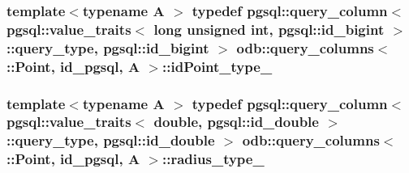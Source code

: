 \subsubsection[{id\+Point\+\_\+type\+\_\+}]{\setlength{\rightskip}{0pt plus 5cm}template$<$typename A $>$ typedef pgsql\+::query\+\_\+column$<$ pgsql\+::value\+\_\+traits$<$ long unsigned int, pgsql\+::id\+\_\+bigint $>$\+::query\+\_\+type, pgsql\+::id\+\_\+bigint $>$ odb\+::query\+\_\+columns$<$ \+::{\bf Point}, id\+\_\+pgsql, A $>$\+::{\bf id\+Point\+\_\+type\+\_\+}}\label{structodb_1_1query__columns_3_01_1_1_point_00_01id__pgsql_00_01_a_01_4_a1b73c11154d6a12b3bda33b0362e1cbd}
\hypertarget{structodb_1_1query__columns_3_01_1_1_point_00_01id__pgsql_00_01_a_01_4_a920c99ed9235ee77ecae8f3de56c88b5}{}
\subsubsection[{radius\+\_\+type\+\_\+}]{\setlength{\rightskip}{0pt plus 5cm}template$<$typename A $>$ typedef pgsql\+::query\+\_\+column$<$ pgsql\+::value\+\_\+traits$<$ double, pgsql\+::id\+\_\+double $>$\+::query\+\_\+type, pgsql\+::id\+\_\+double $>$ odb\+::query\+\_\+columns$<$ \+::{\bf Point}, id\+\_\+pgsql, A $>$\+::{\bf radius\+\_\+type\+\_\+}}\label{structodb_1_1query__columns_3_01_1_1_point_00_01id__pgsql_00_01_a_01_4_a920c99ed9235ee77ecae8f3de56c88b5}
\hypertarget{structodb_1_1query__columns_3_01_1_1_point_00_01id__pgsql_00_01_a_01_4_a7990da27718c07e8f22372ebf2141b5c}{}
